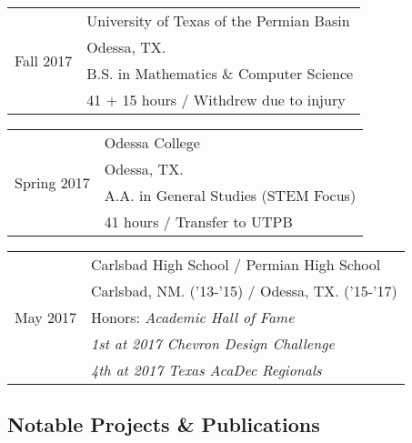 \documentclass[letterpaper,]{article}
\begin{document}
\begin{table}[H]
	\begin{minipage}{0.5\linewidth}
	\centering
	\begin{tabular}{r|l}
		\multirow{4}{*}{Fall 2017}
		& University of Texas of the Permian Basin \\
		& Odessa, TX. \\
		& B.S. in Mathematics \& Computer Science \\
		& 41 + 15 hours / Withdrew due to injury \\
	\end{tabular}
	\end{minipage}
	\begin{minipage}{0.5\linewidth}
	\centering
	\begin{tabular}{r|l}
		\multirow{4}{*}{Spring 2017} 
		& Odessa College \\
		& Odessa, TX. \\
		& A.A. in General Studies (STEM Focus) \\
		& 41 hours / Transfer to UTPB \\
	\end{tabular}
	\end{minipage}
	\vspace{1.1em}
	\begin{center}
	\begin{minipage}{0.5\linewidth}
	\centering
	\begin{tabular}{r|l}
		\multirow{5}{*}{May 2017} 
		& Carlsbad High School / Permian High School \\
		& Carlsbad, NM. ('13-'15) / Odessa, TX. ('15-'17)  \\
		& Honors: \textit{Academic Hall of Fame} \\
		& \textit{1st at 2017 Chevron Design Challenge} \\
		& \textit{4th at 2017 Texas AcaDec Regionals} \\
	\end{tabular}
	\end{minipage}
	\end{center}
\end{table}


\subsection{Notable Projects \& Publications}\label{projects}
\end{document}
